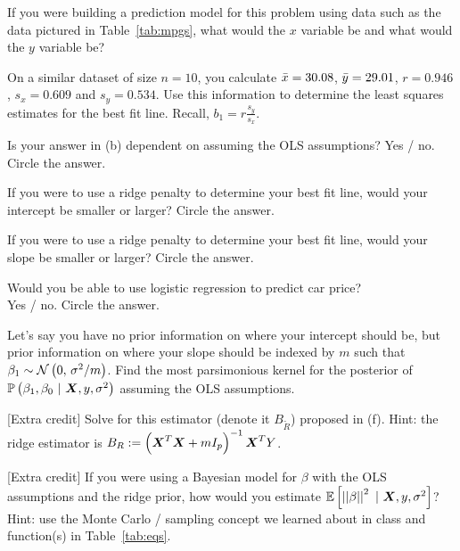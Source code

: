 \documentclass[12pt]{article}
\begin{document}


\benum
{} If you were building a prediction model for this problem using data such as the data pictured in Table~\ref{tab:mpgs}, what would the $x$ variable be and what would the $y$ variable be? 

 On a similar dataset of size $n = 10$, you calculate $\bar{x} = 30.08$, $\bar{y} = 29.01$, $r = 0.946$, $s_x = 0.609$ and $s_y = 0.534$. Use this information to determine the least squares estimates for the best fit line. Recall, $b_1 = r\frac{s_y}{s_x}$. 

 Is your answer in (b) dependent on assuming the OLS assumptions? Yes / no. Circle the answer.   \vspace{-0.7cm}

 If you were to use a ridge penalty to determine your best fit line, would your intercept be smaller or larger? Circle the answer.   \vspace{-0.7cm}

 If you were to use a ridge penalty to determine your best fit line, would your slope be smaller or larger? Circle the answer.   \vspace{-0.7cm}

 Would you be able to use logistic regression to predict car price? \\ Yes / no. Circle the answer.   \vspace{-0.7cm}

 Let's say you have no prior information on where your intercept should be, but prior information on where your slope should be indexed by $m$ such that $\beta_1 \sim \mathcal{N}\left(0,\,\sigma^2 / m\right)$. Find the most parsimonious kernel for the posterior of $\mathbb{P}\left(\beta_1, \beta_0~|~\boldsymbol{X}, y, \sigma^2\right)$ assuming the OLS assumptions. 

 [Extra credit] Solve for this  estimator (denote it $B_{\tilde{R}}$) proposed in (f). Hint: the ridge estimator is $B_R := \left(\boldsymbol{X}^T\boldsymbol{X} +m I_p\right)^{-1} \boldsymbol{X}^T Y$.

 [Extra credit] If you were using a Bayesian model for $\beta$ with the OLS assumptions and the ridge prior, how would you estimate $\mathbb{E}\left[\left|\left|\beta\right|\right|^2~|~\boldsymbol{X}, y, \sigma^2\right]$? Hint: use the Monte Carlo / sampling concept we learned about in class and function(s) in Table~\ref{tab:eqs}.
\end{document}
